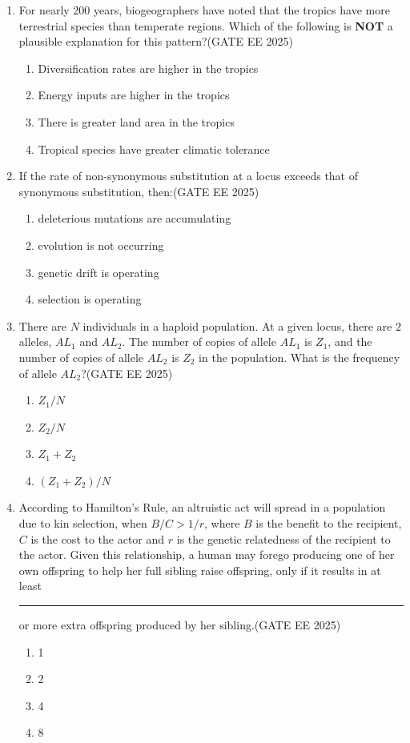 \begin{enumerate}[leftmargin=*,label=\textbf{Q.\arabic*},resume]

\item For nearly 200 years, biogeographers have noted that the tropics have more terrestrial species than temperate regions. Which of the following is \textbf{NOT} a plausible explanation for this pattern?\hfill {(GATE EE 2025)}
\begin{enumerate}
\item Diversification rates are higher in the tropics
\item Energy inputs are higher in the tropics
\item There is greater land area in the tropics
\item Tropical species have greater climatic tolerance
\end{enumerate}

\item If the rate of non-synonymous substitution at a locus exceeds that of synonymous substitution, then:\hfill {(GATE EE 2025)}
\begin{enumerate}
\item deleterious mutations are accumulating
\item evolution is not occurring
\item genetic drift is operating
\item selection is operating
\end{enumerate}

\item There are $N$ individuals in a haploid population. At a given locus, there are $2$ alleles, $AL_1$ and $AL_2$. The number of copies of allele $AL_1$ is $Z_1$, and the number of copies of allele $AL_2$ is $Z_2$ in the population. What is the frequency of allele $AL_2$?\hfill {(GATE EE 2025)}
\begin{enumerate}
\item $Z_1/N$
\item $Z_2/N$
\item $Z_1 + Z_2$
\item $(Z_1 + Z_2)/N$
\end{enumerate}

\item According to Hamilton's Rule, an altruistic act will spread in a population due to kin selection, when $B/C > 1/r$, where $B$ is the benefit to the recipient, $C$ is the cost to the actor and $r$ is the genetic relatedness of the recipient to the actor. Given this relationship, a human may forego producing one of her own offspring to help her full sibling raise offspring, only if it results in at least \rule{2cm}{0.15mm} or more extra offspring produced by her sibling.\hfill {(GATE EE 2025)}
\begin{enumerate}
\item 1
\item 2
\item 4
\item 8
\end{enumerate}


\end{enumerate}
